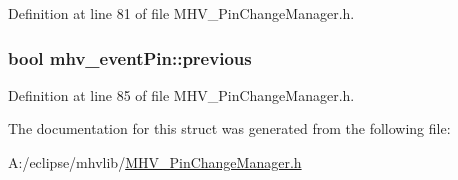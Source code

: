 Definition at line 81 of file M\-H\-V\-\_\-\-Pin\-Change\-Manager.\-h.

\hypertarget{structmhv__event_pin_a6c6bc6a868d6402c34a5024447473618}{
\subsubsection[{previous}]{\setlength{\rightskip}{0pt plus 5cm}bool mhv\-\_\-event\-Pin\-::previous}}\label{structmhv__event_pin_a6c6bc6a868d6402c34a5024447473618}


Definition at line 85 of file M\-H\-V\-\_\-\-Pin\-Change\-Manager.\-h.



The documentation for this struct was generated from the following file\-:\begin{DoxyCompactItemize}
\item 
A\-:/eclipse/mhvlib/\hyperlink{_m_h_v___pin_change_manager_8h}{M\-H\-V\-\_\-\-Pin\-Change\-Manager.\-h}\end{DoxyCompactItemize}
